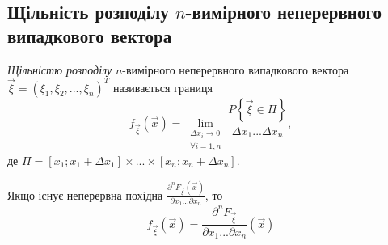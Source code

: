 \subsection{Щільність розподілу \texorpdfstring{$n$}{n}-вимірного неперервного випадкового 
вектора}
\begin{definition}
    \emph{Щільністю розподілу} $n$-вимірного неперервного випадкового 
    вектора $\vec{\xi} = \left(\xi_1, \xi_2, ..., \xi_n\right)^T$ називається границя
    \begin{equation}
        f_{\vec{\xi}} (\vec{x}) = \lim_{\substack{\Delta x_i \to 0 \\
        \forall i = \overline{1,n}}} 
        \frac{P\left\{\vec{\xi} \in \Pi\right\}}{\Delta x_1...\Delta x_n},
    \end{equation}
    де $\Pi = 
    \left[x_1; x_1+\Delta x_1\right] \times ... \times 
    \left[x_n; x_n+\Delta x_n\right]$.

    Якщо існує неперервна похідна $\frac{\partial^n F_{\vec{\xi}}(\vec{x})}
    {\partial x_1 ... \partial x_n}$, то
    \begin{equation}
        f_{\vec{\xi}} (\vec{x}) = \frac{\partial^n F_{\vec{\xi}}}
        {\partial x_1 ... \partial x_n}(\vec{x})
    \end{equation}
\end{definition}

